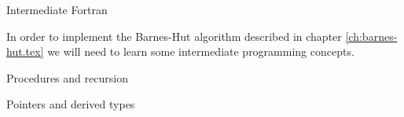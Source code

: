 
 {Intermediate Fortran}
\label{sec:intermediate-fortran}

In order to implement the Barnes-Hut algorithm described in chapter
\ref{ch:barnes-hut.tex} we will need to learn some intermediate programming
concepts.

 {Procedures and recursion}

       
 {Pointers and derived types}
{}




